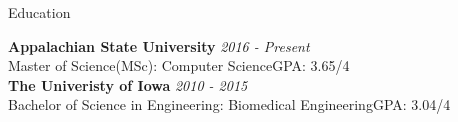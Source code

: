 \documentclass{resume} %
\begin{document}

\begin{rSection}{Education}

{\bf Appalachian State University} \hfill {\em 2016 - Present} 
\\ Master of Science(MSc): Computer Science\hfill {GPA: 3.65/4}
\\
{\bf The Univeristy of Iowa} \hfill {\em 2010 - 2015} 
\\ Bachelor of Science in Engineering: Biomedical Engineering\hfill {GPA: 3.04/4}


\end{rSection}




\end{document}
